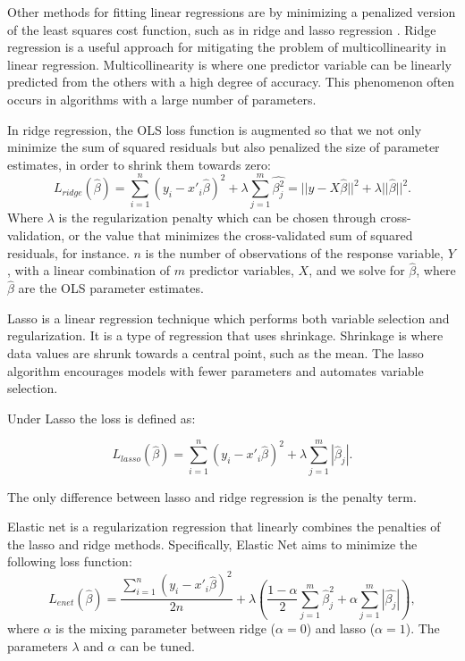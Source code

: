 \documentclass[final,3p,times,twocolumn,numbers]{elsarticle}
\begin{document}
Other methods for fitting linear regressions are by minimizing a penalized version of the least squares cost function, such as in ridge and lasso regression \cite{Tibshirani1996a, GeladiPaul1994Mrac}. Ridge regression is a useful approach for mitigating the problem of multicollinearity in linear regression. Multicollinearity is where one predictor variable can be linearly predicted from the others with a high degree of accuracy. This phenomenon often occurs in algorithms with a large number of parameters. 

In ridge regression, the OLS loss function is augmented so that we not only minimize the sum of squared residuals but also penalized the size of parameter estimates, in order to shrink them towards zero:
\begin{equation}
    L_{ridge}(\hat{\beta})=\sum^n_{i=1}(y_i-x'_i\hat{\beta})^2+\lambda\sum^m_{j=1}\hat{\beta^2_j}=||y-X\hat{\beta}||^2+\lambda||\hat{\beta}||^2.
\end{equation}
Where $\lambda$ is the regularization penalty which can be chosen through cross-validation, or the value that minimizes the cross-validated sum of squared residuals, for instance. $n$ is the number of observations of the response variable, $Y$, with a linear combination of $m$ predictor variables, $X$, and we solve for $\hat{\beta}$, where $\hat{\beta}$ are the OLS parameter estimates.



Lasso is a linear regression technique which performs both variable selection and regularization. It is a type of regression that uses shrinkage. Shrinkage is where data values are shrunk towards a central point, such as the mean. The lasso algorithm encourages models with fewer parameters and automates variable selection.

Under Lasso the loss is defined as:

\begin{equation}
    L_{lasso}(\hat{\beta})=\sum^n_{i=1}(y_i-x'_i\hat{\beta})^2+\lambda\sum^m_{j=1}|\hat{\beta}_j|.
\end{equation}

The only difference between lasso and ridge regression is the penalty term.

Elastic net is a regularization regression that linearly combines the penalties of the lasso and ridge methods. Specifically, Elastic Net aims to minimize the following loss function:
\begin{equation}
L_{enet}(\hat{\beta})=\frac{\sum^n_{i=1}(y_i-x'_i\hat{\beta})^2}{2n}+\lambda\left(\frac{1-\alpha}{2}\sum^m_{j=1}\hat{\beta}^2_j+\alpha\sum^m_{j=1}|\hat{\beta_j}|\right),
\end{equation}
where $\alpha$ is the mixing parameter between ridge ($\alpha=0$) and lasso ($\alpha=1$). The parameters $\lambda$ and $\alpha$ can be tuned.
\end{document}
